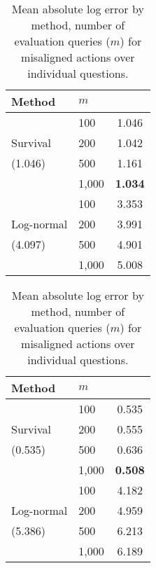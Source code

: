 \begin{table}[h!]
\centering
\begin{subtable}[b]{0.3\textwidth}
    \centering
    \begin{tabular}{llc}
    \toprule
    Method & $m$ & \\
    \midrule
     & 100 & 1.046 \\
     Survival & 200 & 1.042 \\
     (1.046) & 500 & 1.161 \\
     & 1,000 & \textbf{1.034} \\
    \midrule
     & 100 & 3.353 \\
     Log-normal & 200 & 3.991 \\
     (4.097) & 500 & 4.901 \\
     & 1,000 & 5.008 \\
    \bottomrule
    \end{tabular}
    \caption{Individual forecasts}
\end{subtable}
\begin{subtable}[b]{0.3\textwidth}
    \centering
    \begin{tabular}{llc}
    \toprule
    Method & $m$ & \\
    \midrule
     & 100 & 0.535 \\
     Survival & 200 & 0.555 \\
     (0.535) & 500 & 0.636 \\
     & 1,000 & \textbf{0.508} \\
    \midrule
     & 100 & 4.182 \\
     Log-normal & 200 & 4.959 \\
     (5.386) & 500 & 6.213 \\
     & 1,000 & 6.189 \\
    \bottomrule
    \end{tabular}
    \caption{Average forecasts}
\end{subtable}
\caption{Mean absolute log error by method, number of evaluation queries ($m$) for misaligned actions over individual questions.}
\label{tab:oom-errors}
\end{table}